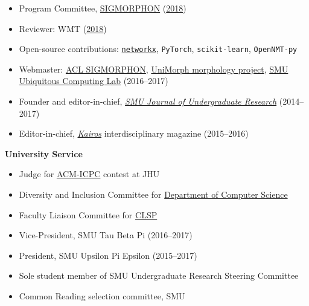 \documentclass[margin, 10pt]{res} %
\newcommand{\clsp}{\href{https://www.clsp.jhu.edu}{CLSP}}
\begin{document}
\begin{resume}
\begin{itemize}[noitemsep]
\item Program Committee,  \href{https://sigmorphon.github.io}{SIGMORPHON} (\href{https://sigmorphon.github.io/workshops/2018/}{2018})
\item Reviewer: WMT (\href{http://www.statmt.org/wmt18/}{2018})
\item Open-source contributions: \href{http://networkx.github.io}{\texttt{networkx}}, \texttt{PyTorch}, \texttt{scikit-learn}, \texttt{OpenNMT-py}
\item Webmaster: \href{https://sigmorphon.github.io}{ACL SIGMORPHON}, \href{https://unimorph.github.io}{UniMorph morphology project}, \href{http://ubicomp.lyle.smu.edu}{SMU Ubiquitous Computing Lab} (2016--2017)
\item Founder and editor-in-chief, \href{https://smuresearch.wordpress.com/journal/}{\emph{SMU Journal of Undergraduate Research}} (2014--2017)
\item Editor-in-chief, \href{https://smuresearch.wordpress.com/kairos/}{\emph{Kairos}} interdisciplinary magazine (2015--2016)
\end{itemize}


\textbf{University Service}

\begin{itemize}[noitemsep]
\item Judge for \href{https://en.wikipedia.org/wiki/ACM_International_Collegiate_Programming_Contest}{ACM-ICPC} contest at JHU
\item Diversity and Inclusion Committee for \href{https://www.cs.jhu.edu}{Department of Computer Science}
\item Faculty Liaison Committee for \clsp
\item Vice-President, SMU Tau Beta Pi (2016--2017)
\item President, SMU Upsilon Pi Epsilon (2015--2017)
\item Sole student member of SMU Undergraduate Research Steering Committee
\item Common Reading selection committee, SMU
\end{itemize}



\end{resume}
\end{document}
